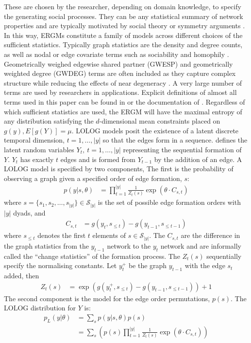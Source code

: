 \documentclass[
]{statsoc}
\begin{document}
These are chosen by the researcher, depending on domain knowledge, to
specify the generating social processes. They can be any statistical
summary of network properties and are typically motivated by social
theory \citep{goodkittsmorris09} or symmetry arguments \citep{str86}. In
this way, ERGMs constitute a family of models across different choices
of the sufficient statistics. Typically graph statistics are the density
and degree counts, as well as nodal or edge covariate terms such as
sociability and homophily \citep{ergmtermsjss}. Geometrically weighed
edgewise shared partner (GWESP) and geometrically weighted degree
(GWDEG) terms are often included \citep{snijders2006} as they capture
complex structure while reducing the effects of near degeneracy
\citep{Handcock2003}. A very large number of terms are used by
researchers in applications. Explicit definitions of almost all terms
used in this paper can be found in \cite{ergmtermsjss} or the
documentation of \cite{ergm_3_9_4}. Regardless of which sufficient
statistics are used, the ERGM will have the maximal entropy of any
distribution satisfying the \(d\)-dimensional mean constraints placed on
\(g(y), E[g(Y)]=\mu\). LOLOG models posit the existence of a latent
discrete temporal dimension, \(t=1, \ldots, |y|\) so that the edges form
in a sequence. \cite{Fellows2018} defines the latent random variables
\(Y_{t},\ t=1, \ldots , |y|\) representing the sequential formation of
\(Y.\) \(Y_{t}\) has exactly \(t\) edges and is formed from \(Y_{t-1}\)
by the addition of an edge. A LOLOG model is specified by two
components, The first is the probability of observing a graph given a
specified order of edge formation, \(s\): \begin{align}
p(y \vert s,\theta) &= \prod_{t=1}^{|y|} \frac{1}{Z_t(s)} \exp\left(\theta\cdot C_{s,t}\right)
\end{align} \noindent where
\(s=\{s_1, s_2, \ldots, s_{|y|}\} \in \mathscr{S}_{|y|}\) is the set of
possible edge formation orders with \(|y|\) dyads, and \begin{align}
C_{s,t} &= g(y_{t},s_{\leq t}) - g(y_{t-1},s_{\leq t-1})
\end{align} \noindent where \(s_{\leq t}\) denotes the first \(t\)
elements of \(s \in \mathscr{S}_{|y|}\). The \(C_{s,t}\) are the
difference in the graph statistics from the \(y_{t-1}\) network to the
\(y_{t}\) network and are informally called the ``change statistics'' of
the formation process. The \(Z_{t}(s)\) sequentially specify the
normalising constants. Let \(y_{t}^{+}\) be the graph \(y_{t-1}\) with
the edge \(s_{t}\) added, then \begin{align}
Z_{t}(s) &= \exp\left(g(y_{t}^{+},s_{\leq t}) - g(y_{t-1},s_{\leq t-1})\right) + 1
\end{align} The second component is the model for the edge order
permutations, \(p(s)\). The LOLOG distribution for \(Y\) is:
\begin{align}
p_{L}(y \vert \theta) &= \sum_{s} p(y \vert s, \theta)p(s) \nonumber \\
&= \sum_{s} \left( p(s)\prod_{t=1}^{|y|} \frac{1}{Z_t(s)} \exp\left(\theta\cdot C_{s,t}\right)\right) \label{eq:lolog}
\end{align}
\end{document}
